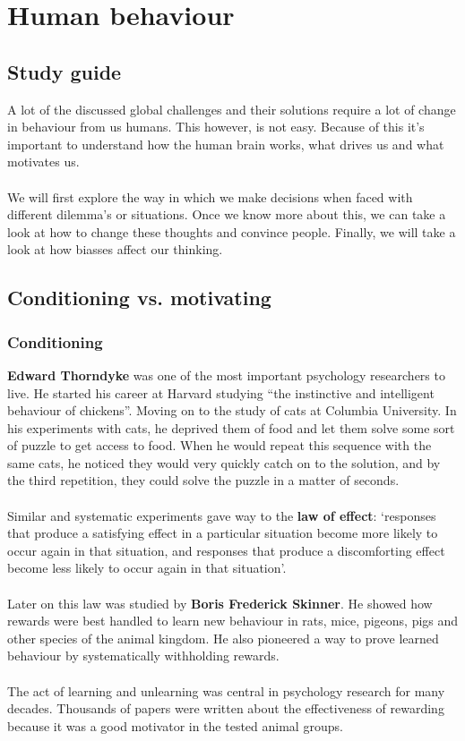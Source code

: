 \documentclass[../summary.tex]{subfiles}
\begin{document}
	\section{Human behaviour}
	
		\subsection{Study guide}
			A lot of the discussed global challenges and their solutions require a lot of change in behaviour from us humans. This however, is not easy. Because of this it's important to understand how the human brain works, what drives us and what motivates us. \\
			\\
			We will first explore the way in which we make decisions when faced with different dilemma's or situations. Once we know more about this, we can take a look at how to change these thoughts and convince people. Finally, we will take a look at how biasses affect our thinking. 
		\subsection{Conditioning vs. motivating}
		\subsubsection{Conditioning}
			\textbf{Edward Thorndyke} was one of the most important psychology researchers to live. He started his career at Harvard studying ``the instinctive and intelligent behaviour of chickens''. Moving on to the study of cats at Columbia University. In his experiments with cats, he deprived them of food and let them solve some sort of puzzle to get access to food. When he would repeat this sequence with the same cats, he noticed they would very quickly catch on to the solution, and by the third repetition, they could solve the puzzle in a matter of seconds. \\
			\\
			Similar and systematic experiments gave way to the \textbf{law of effect}: `responses that produce a satisfying effect in a particular situation become more likely to occur again in that situation, and responses that produce a discomforting effect become less likely to occur again in that situation'.\\
			\\
			Later on this law was studied by \textbf{Boris Frederick Skinner}.   He showed how rewards were best handled to learn new behaviour in rats, mice, pigeons, pigs and other species of the animal kingdom. He also pioneered a way to prove learned behaviour by systematically withholding rewards. \\
			\\
			The act of learning and unlearning was central in psychology research for many decades. Thousands of papers were written about the effectiveness of rewarding because it was a good motivator in the tested animal groups. 
\end{document}
